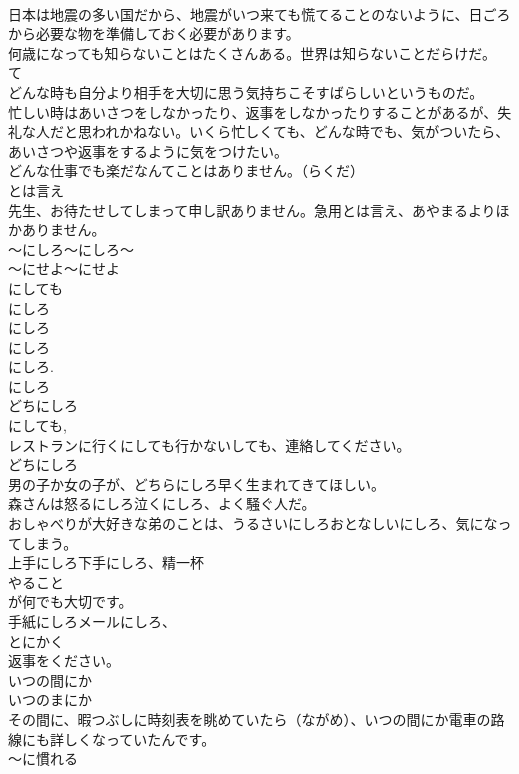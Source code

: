 \documentclass[8pt]{extreport}
\begin{document}
\begin{CJK}{UTF8}{min}
\\	日本は地震の多い国だから、地震がいつ来ても慌てることのないように、日ごろから必要な物を準備しておく必要があります。
\\	何歳になっても知らないことはたくさんある。世界は知らないことだらけだ。
\\	て 
\\	どんな時も自分より相手を大切に思う気持ちこそすばらしいというものだ。
\\	忙しい時はあいさつをしなかったり、返事をしなかったりすることがあるが、失礼な人だと思われかねない。いくら忙しくても、どんな時でも、気がついたら、あいさつや返事をするように気をつけたい。
\\	どんな仕事でも楽だなんてことはありません。（らくだ）
\\	とは言え
\\	先生、お待たせしてしまって申し訳ありません。急用とは言え、あやまるよりほかありません。　
\\	～にしろ～にしろ～
\\	～にせよ～にせよ
\\	にしても 
\\	にしろ
\\	にしろ 
\\	にしろ
\\	にしろ. 
\\	にしろ 
\\	どちにしろ 
\\	にしても, 
\\	レストランに行くにしても行かないしても、連絡してください。
\\	どちにしろ 
\\	男の子か女の子が、どちらにしろ早く生まれてきてほしい。
\\	森さんは怒るにしろ泣くにしろ、よく騒ぐ人だ。
\\	おしゃべりが大好きな弟のことは、うるさいにしろおとなしいにしろ、気になってしまう。
\\	上手にしろ下手にしろ、精一杯
\\	やること
\\	が何でも大切です。
\\	手紙にしろメールにしろ、
\\	とにかく
\\	返事をください。
\\	いつの間にか
\\	いつのまにか
\\	その間に、暇つぶしに時刻表を眺めていたら（ながめ）、いつの間にか電車の路線にも詳しくなっていたんです。	
\\	～に慣れる

\end{CJK}
\end{document}
